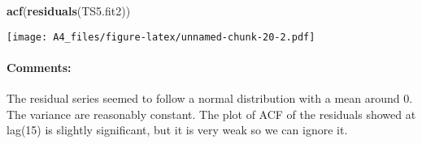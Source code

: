 \documentclass[]{article}
\newenvironment{Shaded}{\begin{snugshade}}{\end{snugshade}}
\newcommand{\KeywordTok}[1]{\textcolor[rgb]{0.13,0.29,0.53}{\textbf{#1}}}
\newcommand{\NormalTok}[1]{#1}
\let\oldparagraph\paragraph
\renewcommand{\paragraph}[1]{\oldparagraph{#1}\mbox{}}
\begin{document}
\begin{Shaded}
\begin{Highlighting}[]
\KeywordTok{acf}\NormalTok{(}\KeywordTok{residuals}\NormalTok{(TS5.fit2)) }
\end{Highlighting}
\end{Shaded}

\texttt{[image: A4\_files/figure-latex/unnamed-chunk-20-2.pdf]}

\hypertarget{comments-6}{%
\paragraph{Comments:}\label{comments-6}}

The residual series seemed to follow a normal distribution with a mean
around 0. The variance are reasonably constant. The plot of ACF of the
residuals showed at lag(15) is slightly significant, but it is very weak
so we can ignore it.
\end{document}
